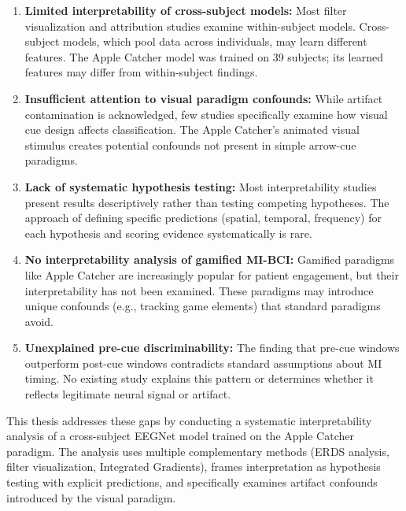 \begin{enumerate}
    \item \textbf{Limited interpretability of cross-subject models:} Most filter visualization and attribution studies examine within-subject models. Cross-subject models, which pool data across individuals, may learn different features. The Apple Catcher model was trained on 39 subjects; its learned features may differ from within-subject findings.
    
    \item \textbf{Insufficient attention to visual paradigm confounds:} While artifact contamination is acknowledged, few studies specifically examine how visual cue design affects classification. The Apple Catcher's animated visual stimulus creates potential confounds not present in simple arrow-cue paradigms.
    
    \item \textbf{Lack of systematic hypothesis testing:} Most interpretability studies present results descriptively rather than testing competing hypotheses. The approach of defining specific predictions (spatial, temporal, frequency) for each hypothesis and scoring evidence systematically is rare.
    
    \item \textbf{No interpretability analysis of gamified MI-BCI:} Gamified paradigms like Apple Catcher are increasingly popular for patient engagement, but their interpretability has not been examined. These paradigms may introduce unique confounds (e.g., tracking game elements) that standard paradigms avoid.
    
    \item \textbf{Unexplained pre-cue discriminability:} The finding that pre-cue windows outperform post-cue windows contradicts standard assumptions about MI timing. No existing study explains this pattern or determines whether it reflects legitimate neural signal or artifact.
\end{enumerate}

This thesis addresses these gaps by conducting a systematic interpretability analysis of a cross-subject EEGNet model trained on the Apple Catcher paradigm. The analysis uses multiple complementary methods (ERDS analysis, filter visualization, Integrated Gradients), frames interpretation as hypothesis testing with explicit predictions, and specifically examines artifact confounds introduced by the visual paradigm.


